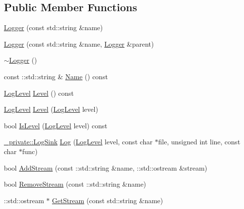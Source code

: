 \subsection*{Public Member Functions}
\begin{DoxyCompactItemize}
\item 
\mbox{\hyperlink{classeasylogger_1_1_logger_a2cb8c991ae2c651f18d3c4d7ded9b3e9}{Logger}} (const std\+::string \&name)
\item 
\mbox{\hyperlink{classeasylogger_1_1_logger_ad0895803e8ba35e55acd32b3a1572526}{Logger}} (const std\+::string \&name, \mbox{\hyperlink{classeasylogger_1_1_logger}{Logger}} \&parent)
\item 
\mbox{\hyperlink{classeasylogger_1_1_logger_a2e3ab6ee87be3ac9b44857972dcd411f}{$\sim$\+Logger}} ()
\item 
const \+::std\+::string \& \mbox{\hyperlink{classeasylogger_1_1_logger_af4c45483c08f4a44ffaff4e86b7012b0}{Name}} () const
\item 
\mbox{\hyperlink{namespaceeasylogger_a68cb882ead21af982c40e3621fcd50b0}{Log\+Level}} \mbox{\hyperlink{classeasylogger_1_1_logger_a350e161f9afb8a6dd764b297aa0baf93}{Level}} () const
\item 
\mbox{\hyperlink{namespaceeasylogger_a68cb882ead21af982c40e3621fcd50b0}{Log\+Level}} \mbox{\hyperlink{classeasylogger_1_1_logger_a66ab7ca8dbdfcdeda3395bc39efc8c1c}{Level}} (\mbox{\hyperlink{namespaceeasylogger_a68cb882ead21af982c40e3621fcd50b0}{Log\+Level}} level)
\item 
bool \mbox{\hyperlink{classeasylogger_1_1_logger_a51a95dca60052b6d2f16bb0f0da7fe45}{Is\+Level}} (\mbox{\hyperlink{namespaceeasylogger_a68cb882ead21af982c40e3621fcd50b0}{Log\+Level}} level) const
\item 
\mbox{\hyperlink{classeasylogger_1_1__private_1_1_log_sink}{\+\_\+private\+::\+Log\+Sink}} \mbox{\hyperlink{classeasylogger_1_1_logger_abbf5fd5ac40a75ed8303e520d99c9b81}{Log}} (\mbox{\hyperlink{namespaceeasylogger_a68cb882ead21af982c40e3621fcd50b0}{Log\+Level}} level, const char $\ast$file, unsigned int line, const char $\ast$func)
\item 
bool \mbox{\hyperlink{classeasylogger_1_1_logger_a12a61baa5ec56a9150a41104a34f0b05}{Add\+Stream}} (const \+::std\+::string \&name, \+::std\+::ostream \&stream)
\item 
bool \mbox{\hyperlink{classeasylogger_1_1_logger_a5fbcc23c2e8defc0862d48844703cdd2}{Remove\+Stream}} (const \+::std\+::string \&name)
\item 
\+::std\+::ostream $\ast$ \mbox{\hyperlink{classeasylogger_1_1_logger_ac4a1ce9232d6c0c7ec7668957d4a35ba}{Get\+Stream}} (const std\+::string \&name)

\end{DoxyCompactItemize}
